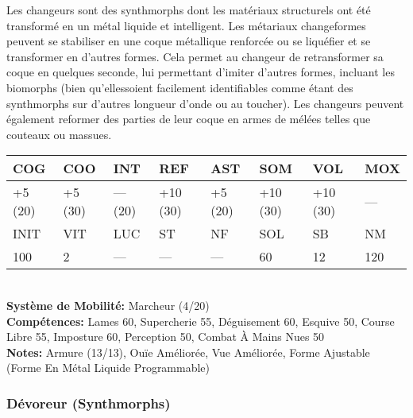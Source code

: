 Les changeurs sont des synthmorphs dont les matériaux structurels ont été transformé en un métal liquide et intelligent. Les métariaux changeformes peuvent se stabiliser en une coque métallique renforcée ou se liquéfier et se transformer en d'autres formes. Cela permet au changeur de retransformer sa coque en quelques seconde, lui permettant d'imiter d'autres formes, incluant les biomorphs (bien qu'ellessoient facilement identifiables comme étant des synthmorphs sur d'autres longueur d'onde ou au toucher). Les changeurs peuvent également reformer des parties de leur coque en armes de mélées telles que couteaux ou massues. \\ \begin{tabular}{|l|l|l|l|l|l|l|l|} \hline

COG &COO &INT &REF &AST &SOM &VOL &MOX \\ \hline

+5 (20) &+5 (30) &— (20) &+10 (30) &+5 (20) &+10 (30) &+10 (30) &— \\ \hline

INIT &VIT &LUC &ST &NF &SOL &SB &NM \\ \hline

100 &2 &— &— &— &60 &12 &120 \\ \hline

\end{tabular} \\ \textbf{Système de Mobilité: }Marcheur (4/20) \\ \textbf{Compétences:} Lames 60, Supercherie 55, Déguisement 60, Esquive 50, Course Libre 55, Imposture 60, Perception 50, Combat À Mains Nues 50 \\ \textbf{Notes: }Armure (13/13), Ouïe Améliorée, Vue Améliorée, Forme Ajustable (Forme En Métal Liquide Programmable) 

\subsubsection{Dévoreur (Synthmorphs)} 

